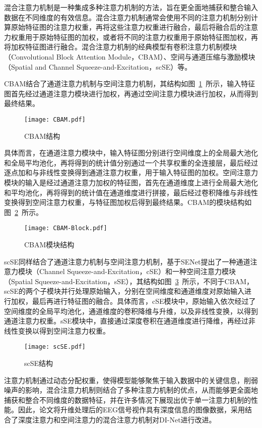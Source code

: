 混合注意力机制是一种集成多种注意力机制的方法，旨在更全面地捕获和整合输入数据在不同维度的有效信息。混合注意力机制通常会使用不同的注意力机制分别计算原始特征图的注意力权重，再将这些注意力权重进行融合，最后将融合后的注意力权重用于原始特征图的加权，或者将不同的注意力权重用于原始特征图加权，再将加权特征图进行融合。混合注意力机制的经典模型有卷积注意力机制模块（Convolutional Block Attention Module，CBAM）\cite{woo2018cbam}、空间与通道压缩与激励模块（Spatial and Channel Squeeze-and-Excitation，scSE）\cite{roy2018concurrent}等。
    
CBAM结合了通道注意力机制与空间注意力机制，其结构如图~\ref{fig:CBAM}~所示，输入特征图首先经过通道注意力模块进行加权，再通过空间注意力模块进行加权，从而得到最终结果。
\begin{figure}[ht]
    \centering
    \texttt{[image: CBAM.pdf]}
    \caption{CBAM结构\cite{woo2018cbam}}
    \label{fig:CBAM}
\end{figure}

具体而言，在通道注意力模块中，输入特征图分别进行空间维度上的全局最大池化和全局平均池化，再将得到的统计值分别通过一个共享权重的全连接层，最后经过逐点加和与非线性变换得到通道注意力权重，用于输入特征图的加权。空间注意力模块的输入是经过通道注意力加权的特征图，首先在通道维度上进行全局最大池化和平均池化，再将得到的统计值在通道维度进行拼接，最后经过卷积降维与非线性变换得到空间注意力权重，与特征图加权后得到最终结果。CBAM的模块结构如图~\ref{fig:CBAM-Block}~所示。
\begin{figure}[ht]
  \centering
  \texttt{[image: CBAM-Block.pdf]}
  \caption{CBAM模块结构\cite{woo2018cbam}}
  \label{fig:CBAM-Block}
\end{figure}

scSE同样结合了通道注意力机制与空间注意力机制，基于SENet提出了一种通道注意力模块（Channel Squeeze-and-Excitation，cSE）和一种空间注意力模块（Spatial Squeeze-and-Excitation，sSE），其结构如图~\ref{fig:scSE}~所示，不同于CBAM，scSE的两个子模块并行处理原始输入，分别在空间维度和通道维度对原始输入进行加权，最后再进行特征图的融合。具体而言，cSE模块中，原始输入依次经过了空间维度的全局平均池化，通道维度的卷积降维与升维，以及非线性变换，以得到通道注意力权重。sSE模块中，直接通过深度卷积在通道维度进行降维，再经过非线性变换以得到空间注意力权重。
\begin{figure}[ht]
    \centering
    \texttt{[image: scSE.pdf]}
    \caption{scSE结构\cite{roy2018concurrent}}
    \label{fig:scSE}
\end{figure}

注意力机制通过动态分配权重，使得模型能够聚焦于输入数据中的关键信息，削弱噪声的影响，混合注意力机制则结合了多种注意力机制的优点，从而能够更全面地捕获和整合不同维度的数据特征，并在许多情况下展现出优于单一注意力机制的性能。因此，论文将升维处理后的EEG信号视作具有深度信息的图像数据，采用结合了深度注意力和空间注意力的混合注意力机制对DI-Net进行改进。

